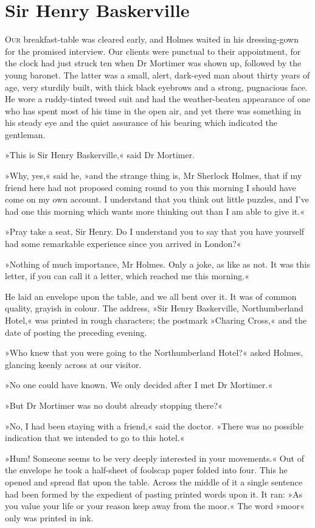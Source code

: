 \chapter{Sir Henry Baskerville}
\lettrine[lines=1]{O}{ur} breakfast-table was cleared early, and Holmes waited in his dressing-gown for the promised interview. Our clients were punctual to their appointment, for the clock had just struck ten when Dr Mortimer was shown up, followed by the young baronet. The latter was a small, alert, dark-eyed man about thirty years of age, very sturdily built, with thick black eyebrows and a strong, pugnacious face. He wore a ruddy-tinted tweed suit and had the weather-beaten appearance of one who has spent most of his time in the open air, and yet there was something in his steady eye and the quiet assurance of his bearing which indicated the gentleman.

»This is Sir Henry Baskerville,« said Dr Mortimer.

»Why, yes,« said he, »and the strange thing is, Mr Sherlock Holmes, that if my friend here had not proposed coming round to you this morning I should have come on my own account. I understand that you think out little puzzles, and I've had one this morning which wants more thinking out than I am able to give it.«

»Pray take a seat, Sir Henry. Do I understand you to say that you have yourself had some remarkable experience since you arrived in London?«

»Nothing of much importance, Mr Holmes. Only a joke, as like as not. It was this letter, if you can call it a letter, which reached me this morning.«

He laid an envelope upon the table, and we all bent over it. It was of common quality, grayish in colour. The address, »Sir Henry Baskerville, Northumberland Hotel,« was printed in rough characters; the postmark »Charing Cross,« and the date of posting the preceding evening.

»Who knew that you were going to the Northumberland Hotel?« asked Holmes, glancing keenly across at our visitor.

»No one could have known. We only decided after I met Dr Mortimer.«

»But Dr Mortimer was no doubt already stopping there?«

»No, I had been staying with a friend,« said the doctor. »There was no possible indication that we intended to go to this hotel.«

»Hum! Someone seems to be very deeply interested in your movements.« Out of the envelope he took a half-sheet of foolscap paper folded into four. This he opened and spread flat upon the table. Across the middle of it a single sentence had been formed by the expedient of pasting printed words upon it. It ran: »As you value your life or your reason keep away from the moor.« The word »moor« only was printed in ink.

